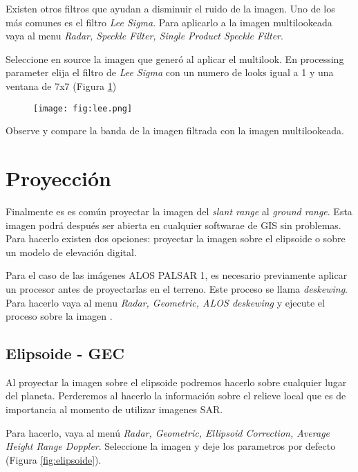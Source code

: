 Existen otros filtros que ayudan a disminuir el ruido de la imagen. Uno de los más comunes es el filtro \emph{Lee Sigma}. Para aplicarlo a la imagen multilookeada vaya al menu \emph{Radar, Speckle Filter, Single Product Speckle Filter}.

Seleccione en source la imagen  que generó al aplicar el multilook. En processing parameter elija el filtro de \emph{Lee Sigma} con un numero de looks igual a 1 y una ventana de 7x7 (Figura \ref{fig:lee})

\begin{figure}[h!]
    \centering
    \texttt{[image: fig:lee.png]}
    \caption{}
    \label{fig:lee}
\end{figure}

\begin{que}
    Observe y compare la banda  de la imagen filtrada con la imagen multilookeada.
\end{que}

\section{Proyección}

Finalmente es es común proyectar la imagen del \emph{slant range} al \emph{ground range}. Esta imagen podrá después ser abierta en cualquier softwarae de GIS sin problemas. Para hacerlo existen dos opciones: proyectar la imagen sobre el elipsoide o sobre un modelo de elevación digital.

Para el caso de las imágenes ALOS PALSAR 1, es necesario previamente aplicar un procesor antes de proyectarlas en el terreno. Este proceso se llama \emph{deskewing}. Para hacerlo vaya al menu \emph{Radar, Geometric, ALOS deskewing} y ejecute el proceso sobre la imagen .

\subsection{Elipsoide - GEC}

Al proyectar la imagen sobre el elipsoide podremos hacerlo sobre cualquier lugar del planeta. Perderemos al hacerlo la información sobre el relieve local que es de importancia al momento de utilizar imagenes SAR.

Para hacerlo, vaya al menú \emph{Radar, Geometric, Ellipsoid Correction, Average Height Range Doppler}. Seleccione la imagen  y deje los parametros por defecto (Figura \ref{fig:elipsoide}).

